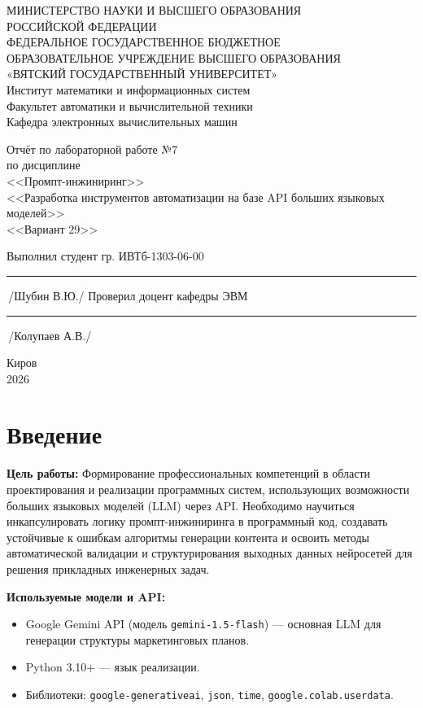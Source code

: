 \documentclass[oneside,a4paper,14pt]{extarticle}
\begin{document}
	\newpage\thispagestyle{empty}
	\begin{center}
		МИНИСТЕРСТВО НАУКИ И ВЫСШЕГО ОБРАЗОВАНИЯ\\
		РОССИЙСКОЙ ФЕДЕРАЦИИ\\
		ФЕДЕРАЛЬНОЕ ГОСУДАРСТВЕННОЕ БЮДЖЕТНОЕ\\
		ОБРАЗОВАТЕЛЬНОЕ УЧРЕЖДЕНИЕ ВЫСШЕГО ОБРАЗОВАНИЯ\\
		«ВЯТСКИЙ ГОСУДАРСТВЕННЫЙ УНИВЕРСИТЕТ»\\
		Институт математики и информационных систем\\
		Факультет автоматики и вычислительной техники\\
		Кафедра электронных вычислительных машин
	\end{center}
	\vspace{20mm}
	\begin{center}
		Отчёт по лабораторной работе №7\\
		по дисциплине\\
		<<Промпт-инжиниринг>>\\
		<<Разработка инструментов автоматизации на базе API больших языковых моделей>>\\
		<<Вариант 29>>\\
	\end{center}
	\vspace{48mm}
	\noindent
	Выполнил студент гр. ИВТб-1303-06-00 \hfill \rule[-0.5mm]{30mm}{0.15mm}\,/Шубин В.Ю./
	\newline
	Проверил доцент кафедры ЭВМ \hfill \rule[-0.5mm]{30mm}{0.15mm}\,/Колупаев А.В./
	\vfill
	\begin{center}
		Киров\\
		2026
	\end{center}
	
	\newpage
	\thispagestyle{empty}
	\section*{Введение}
	\noindent
	\textbf{Цель работы:} Формирование профессиональных компетенций в области проектирования и реализации программных систем, использующих возможности больших языковых моделей (LLM) через API. Необходимо научиться инкапсулировать логику промпт-инжиниринга в программный код, создавать устойчивые к ошибкам алгоритмы генерации контента и освоить методы автоматической валидации и структурирования выходных данных нейросетей для решения прикладных инженерных задач.
	
	\noindent
	\textbf{Используемые модели и API:}
	\begin{itemize}
		\item Google Gemini API (модель \texttt{gemini-1.5-flash}) --- основная LLM для генерации структуры маркетинговых планов.
		\item Python 3.10+ --- язык реализации.
		\item Библиотеки: \texttt{google-generativeai}, \texttt{json}, \texttt{time}, \texttt{google.colab.userdata}.
	\end{itemize}
	
\end{document}

